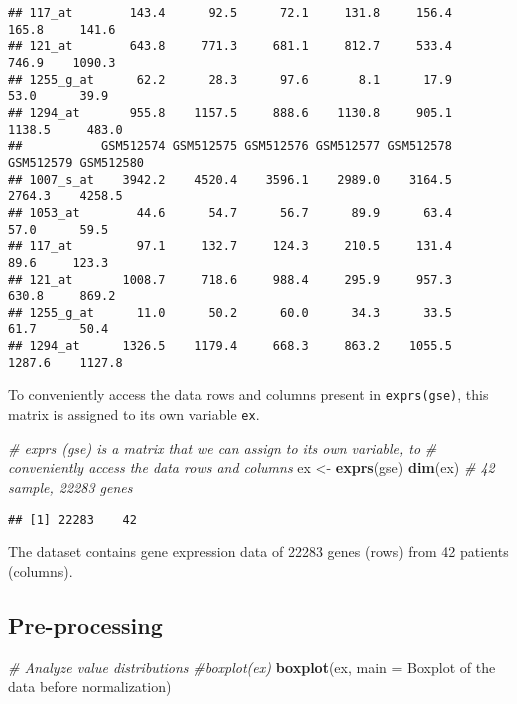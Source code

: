 \documentclass[
]{article}
\newenvironment{Shaded}{\begin{snugshade}}{\end{snugshade}}
\newcommand{\AttributeTok}[1]{\textcolor[rgb]{0.13,0.29,0.53}{#1}}
\newcommand{\CommentTok}[1]{\textcolor[rgb]{0.56,0.35,0.01}{\textit{#1}}}
\newcommand{\FunctionTok}[1]{\textcolor[rgb]{0.13,0.29,0.53}{\textbf{#1}}}
\newcommand{\NormalTok}[1]{#1}
\newcommand{\OtherTok}[1]{\textcolor[rgb]{0.56,0.35,0.01}{#1}}
\newcommand{\StringTok}[1]{\textcolor[rgb]{0.31,0.60,0.02}{#1}}
\begin{document}
\begin{verbatim}
## 117_at        143.4      92.5      72.1     131.8     156.4     165.8     141.6
## 121_at        643.8     771.3     681.1     812.7     533.4     746.9    1090.3
## 1255_g_at      62.2      28.3      97.6       8.1      17.9      53.0      39.9
## 1294_at       955.8    1157.5     888.6    1130.8     905.1    1138.5     483.0
##           GSM512574 GSM512575 GSM512576 GSM512577 GSM512578 GSM512579 GSM512580
## 1007_s_at    3942.2    4520.4    3596.1    2989.0    3164.5    2764.3    4258.5
## 1053_at        44.6      54.7      56.7      89.9      63.4      57.0      59.5
## 117_at         97.1     132.7     124.3     210.5     131.4      89.6     123.3
## 121_at       1008.7     718.6     988.4     295.9     957.3     630.8     869.2
## 1255_g_at      11.0      50.2      60.0      34.3      33.5      61.7      50.4
## 1294_at      1326.5    1179.4     668.3     863.2    1055.5    1287.6    1127.8
\end{verbatim}

To conveniently access the data rows and columns present in
\texttt{exprs(gse)}, this matrix is assigned to its own variable
\texttt{ex}.

\begin{Shaded}
\begin{Highlighting}[]
\CommentTok{\# exprs (gse) is a matrix that we can assign to its own variable, to}
\CommentTok{\# conveniently access the data rows and columns}
\NormalTok{ex }\OtherTok{\textless{}{-}} \FunctionTok{exprs}\NormalTok{(gse)}
\FunctionTok{dim}\NormalTok{(ex) }\CommentTok{\# 42 sample, 22283 genes}
\end{Highlighting}
\end{Shaded}

\begin{verbatim}
## [1] 22283    42
\end{verbatim}

The dataset contains gene expression data of 22283 genes (rows) from 42
patients (columns).

\subsection{Pre-processing}\label{pre-processing}

\begin{Shaded}
\begin{Highlighting}[]
\CommentTok{\# Analyze value distributions}
\CommentTok{\#boxplot(ex)}
\FunctionTok{boxplot}\NormalTok{(ex, }\AttributeTok{main =} \StringTok{\textquotesingle{}Boxplot of the data before normalization\textquotesingle{}}\NormalTok{)}
\end{Highlighting}
\end{Shaded}
\end{document}
